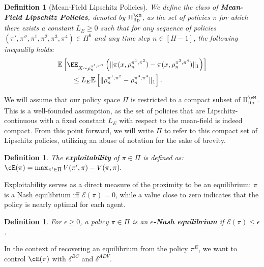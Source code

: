 \documentclass{article}
\newcommand{\defi}[1]{{\bf #1}}
\theoremstyle{plain}
\newtheorem{definition}[theorem]{Definition}
\begin{document}
\begin{definition}[Mean-Field Lipschitz Policies]
    \label{definition:piE-Lipschitz}
    We define the class of \defi{Mean-Field Lipschitz Policies}, denoted by $\Pi^\cM_{\text{lip}}$, as the set of policies $\pi$ for which there exists a constant $L_E \ge 0$ such that for any sequence of policies $(\pi', \pi'', \pi^1, \pi^2, \pi^3, \pi^4) \in \Pi^6$ and any time step $n \in [H-1]$, the following inequality holds: 
    \begin{align*}
    &\mathbb{E} \left[ 
        \EE_{X\sim\rho_n^{\pi',\pi''}} \left(
      \|\pi(x,\rho_n^{\pi^1,\pi^2})
        -\pi( x,\rho_n^{\pi^3,\pi^4})\|_1 \right)
    \right] \\
    &\qquad \le L_E \mathbb{E} \left[ 
        \|\rho_n^{\pi^1,\pi^2} - \rho_n^{\pi^3,\pi^4}\|_1 
    \right].
    \end{align*}
\end{definition}
We will assume that our policy space $\Pi$ is restricted to a compact subset of $\Pi^\cM_{\text{lip}}$. This is a well-founded assumption, as the set of policies that are Lipschitz-continuous with a fixed constant $L_E$ with respect to the mean-field is indeed compact. From this point forward, we will write $\Pi$ to refer to this compact set of Lipschitz policies, utilizing an abuse of notation for the sake of brevity.
\begin{definition}
    The \defi{exploitability} of $\pi \in \Pi$ is defined as:
    $
        \cE(\pi) = \max_{\pi' \in \Pi} V(\pi', \pi) - V(\pi, \pi).
    $
\end{definition}
Exploitability serves as a direct measure of the proximity to be an equilibrium: $\pi$ is a Nash equilibrium iff $\mathcal{E}(\pi) = 0$, while a value close to zero indicates that the policy is nearly optimal for each agent. 
\begin{definition}
    For $\epsilon \ge 0$, a policy $\pi \in \Pi$ is an \defi{$\epsilon$-Nash equilibrium} if $\mathcal{E}(\pi) \leq \epsilon$.
\end{definition}
In the context of recovering an equilibrium from the policy $\pi^E$, we want to control $\cE(\pi) $ with $\delta^{BC}$ and $\delta^{ADV}$.
\end{document}
